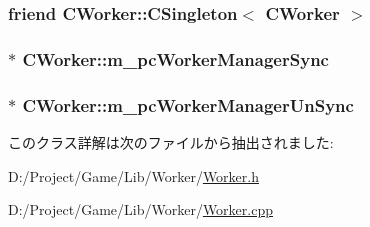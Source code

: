 \subsubsection[{C\+Singleton$<$ C\+Worker $>$}]{\setlength{\rightskip}{0pt plus 5cm}friend {\bf C\+Worker\+::\+C\+Singleton}$<$ {\bf C\+Worker} $>$\hspace{0.3cm}{\ttfamily [private]}}\label{class_c_worker_aecbc638ed646f882a08fe4b6d6c4653c}
\hypertarget{class_c_worker_ae982e4473bdc5cee56f351c9888007f5}{}
\subsubsection[{m\+\_\+pc\+Worker\+Manager\+Sync}]{$\ast$ C\+Worker\+::m\+\_\+pc\+Worker\+Manager\+Sync\hspace{0.3cm}{\ttfamily [private]}}\label{class_c_worker_ae982e4473bdc5cee56f351c9888007f5}
\hypertarget{class_c_worker_ab96d974805f466c392897f55cd13e000}{}
\subsubsection[{m\+\_\+pc\+Worker\+Manager\+Un\+Sync}]{$\ast$ C\+Worker\+::m\+\_\+pc\+Worker\+Manager\+Un\+Sync\hspace{0.3cm}{\ttfamily [private]}}\label{class_c_worker_ab96d974805f466c392897f55cd13e000}


このクラス詳解は次のファイルから抽出されました\+:\begin{DoxyCompactItemize}
\item 
D\+:/\+Project/\+Game/\+Lib/\+Worker/\hyperlink{_worker_8h}{Worker.\+h}\item 
D\+:/\+Project/\+Game/\+Lib/\+Worker/\hyperlink{_worker_8cpp}{Worker.\+cpp}\end{DoxyCompactItemize}
